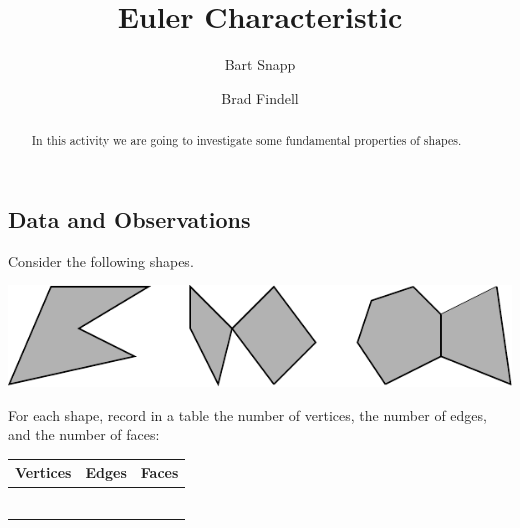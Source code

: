 \documentclass[nooutcomes,noauthor]{ximera}
\title{Euler Characteristic}
\author{Bart Snapp \and Brad Findell}
\begin{document}
\begin{abstract}
In this activity we are going to investigate some fundamental
properties of shapes.
\end{abstract}
\maketitle

\subsection{Data and Observations}


\begin{question}
Consider the following shapes.
\begin{image}
\includegraphics{eulerCharPoly}
\end{image}
For each shape, record in a table the number of vertices, the number of edges,
and the number of faces:
\begin{center}
\begin{tabular}{c|c|c}
Vertices & Edges & Faces\\
\hline
\phantom{\rule{2cm}{.15mm}} & \phantom{\rule{2cm}{.15mm}} & \phantom{\rule{2cm}{.15mm}} \\
\phantom{\rule{2cm}{.15mm}} & \phantom{\rule{2cm}{.15mm}} & \phantom{\rule{2cm}{.15mm}} \\
\phantom{\rule{2cm}{.15mm}} & \phantom{\rule{2cm}{.15mm}} & \phantom{\rule{2cm}{.15mm}} \\
\phantom{\rule{2cm}{.15mm}} & \phantom{\rule{2cm}{.15mm}} & \phantom{\rule{2cm}{.15mm}} \\
\phantom{\rule{2cm}{.15mm}} & \phantom{\rule{2cm}{.15mm}} & \phantom{\rule{2cm}{.15mm}} \\
\phantom{\rule{2cm}{.15mm}} & \phantom{\rule{2cm}{.15mm}} & \phantom{\rule{2cm}{.15mm}} \end{tabular}
\end{center}
\end{question}
\end{document}
